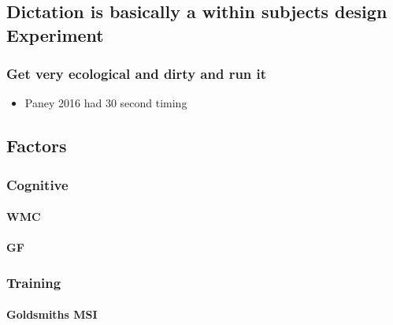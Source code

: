 \documentclass[]{book}
\providecommand{\tightlist}{%
  \setlength{\itemsep}{0pt}\setlength{\parskip}{0pt}}
\let\oldparagraph\paragraph
\renewcommand{\paragraph}[1]{\oldparagraph{#1}\mbox{}}
\begin{document}
\hypertarget{dictation-is-basically-a-within-subjects-design-experiment}{%
\subsection{Dictation is basically a within subjects design Experiment}\label{dictation-is-basically-a-within-subjects-design-experiment}}

\hypertarget{get-very-ecological-and-dirty-and-run-it}{%
\subsubsection{Get very ecological and dirty and run it}\label{get-very-ecological-and-dirty-and-run-it}}

\begin{itemize}
\tightlist
\item
  Paney 2016 had 30 second timing
\end{itemize}

\hypertarget{factors}{%
\subsection{Factors}\label{factors}}

\hypertarget{cognitive-1}{%
\subsubsection{Cognitive}\label{cognitive-1}}

\hypertarget{wmc}{%
\paragraph{WMC}\label{wmc}}

\hypertarget{gf}{%
\paragraph{GF}\label{gf}}

\hypertarget{training}{%
\subsubsection{Training}\label{training}}

\hypertarget{goldsmiths-msi}{%
\paragraph{Goldsmiths MSI}\label{goldsmiths-msi}}
\end{document}
